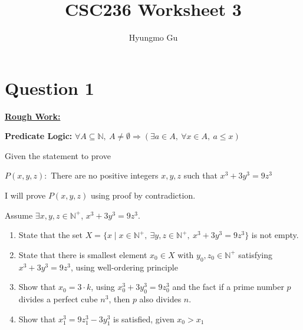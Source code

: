 \documentclass[12pt]{article}
\begin{document}
\title{CSC236 Worksheet 3}
\author{Hyungmo Gu}
\maketitle

\section*{Question 1}

\bigskip

\begin{mdframed}
    \underline{\textbf{Rough Work:}}

    \bigskip

    \textbf{Predicate Logic:} $\forall A \subseteq \mathbb{N},\:A \neq \emptyset \Rightarrow
    (\exists a \in A, \: \forall x \in A,\: a \leq x)$

    \bigskip

    Given the statement to prove

    \bigskip

    \begin{center}
        $P(x,y,z):$ There are no positive integers $x,y,z$ such that $x^3 + 3y^3 = 9z^3$
    \end{center}

    \bigskip

    I will prove $P(x,y,z)$ using proof by contradiction.

    \bigskip

    Assume $\exists x,y,z \in \mathbb{N}^{+}$, $x^3 + 3y^3 = 9z^3$.

    \begin{enumerate}[1.]
        \item State that the set $X = \{x \mid x \in \mathbb{N}^+,\:\exists y,z \in
        \mathbb{N}^+,\:x^3 + 3y^3 = 9z^3\}$ is not empty.

        \item State that there is smallest element $x_0 \in X$ with $y_0,z_0 \in \mathbb{N}^+$
        satisfying $x^3 + 3y^3 = 9z^3$, using well-ordering principle

        \item Show that $x_0 = 3 \cdot k$, using $x_0^3 + 3y_0^3 = 9z_0^3$ and the
        fact if a prime number $p$ divides a perfect cube $n^3$, then $p$ also divides $n$.

        \item Show that $x_1^3 = 9z_1^3 - 3y_1^3$ is satisfied, given $x_0 > x_1$


\end{enumerate}
\end{mdframed}
\end{document}
